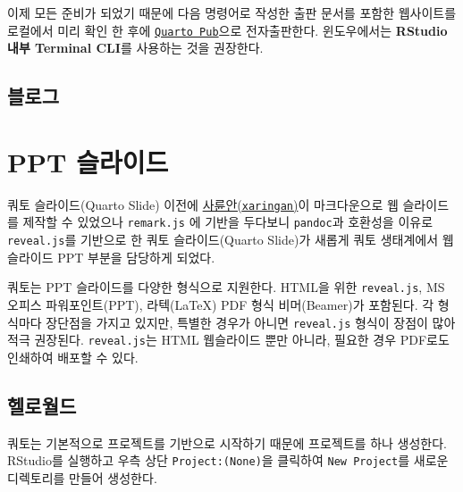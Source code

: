 \documentclass[
  letterpaper,
]{book}
\newenvironment{Shaded}{\begin{snugshade}}{\end{snugshade}}
\newcommand{\NormalTok}[1]{\textcolor[rgb]{0.00,0.23,0.31}{#1}}
\begin{document}
이제 모든 준비가 되었기 때문에 다음 명령어로 작성한 출판 문서를 포함한
웹사이트를 로컬에서 미리 확인 한 후에
\href{https://quartopub.com/}{\texttt{Quarto\ Pub}}으로 전자출판한다.
윈도우에서는 \textbf{RStudio 내부 Terminal CLI}를 사용하는 것을
권장한다.

\begin{Shaded}
\end{Shaded}

\hypertarget{uxbe14uxb85cuxadf8}{%
\section{블로그}\label{uxbe14uxb85cuxadf8}}

\hypertarget{ppt-uxc2acuxb77cuxc774uxb4dc}{%
\chapter{PPT 슬라이드}\label{ppt-uxc2acuxb77cuxc774uxb4dc}}

쿼토 슬라이드(Quarto Slide) 이전에
\href{https://github.com/yihui/xaringan}{사륜안(\texttt{xaringan})}이
마크다운으로 웹 슬라이드를 제작할 수 있었으나 \texttt{remark.js} 에
기반을 두다보니 \texttt{pandoc}과 호환성을 이유로 \texttt{reveal.js}를
기반으로 한 쿼토 슬라이드(Quarto Slide)가 새롭게 쿼토 생태계에서
웹슬라이드 PPT 부분을 담당하게 되었다.

쿼토는 PPT 슬라이드를 다양한 형식으로 지원한다. HTML을 위한
\texttt{reveal.js}, MS 오피스 파워포인트(PPT), 라텍(LaTeX) PDF 형식
비머(Beamer)가 포함된다. 각 형식마다 장단점을 가지고 있지만, 특별한
경우가 아니면 \texttt{reveal.js} 형식이 장점이 많아 적극 권장된다.
\texttt{reveal.js}는 HTML 웹슬라이드 뿐만 아니라, 필요한 경우 PDF로도
인쇄하여 배포할 수 있다.

\hypertarget{uxd5ecuxb85cuxc6d4uxb4dc-2}{%
\section{헬로월드}\label{uxd5ecuxb85cuxc6d4uxb4dc-2}}

쿼토는 기본적으로 프로젝트를 기반으로 시작하기 때문에 프로젝트를 하나
생성한다. RStudio를 실행하고 우측 상단 \texttt{Project:(None)}을
클릭하여 \texttt{New\ Project}를 새로운 디렉토리를 만들어 생성한다.
\end{document}
